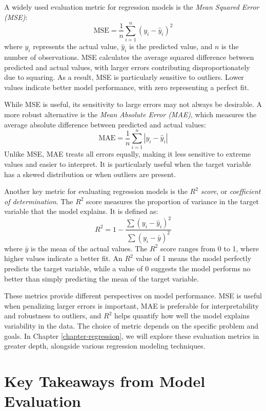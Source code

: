 \documentclass[
  11pt,
]{book}
\theoremstyle{definition}
\theoremstyle{definition}
\theoremstyle{definition}
\theoremstyle{definition}
\theoremstyle{remark}
\begin{document}
A widely used evaluation metric for regression models is the \emph{Mean Squared Error (MSE)}:
\[
\text{MSE} = \frac{1}{n} \sum_{i=1}^{n} (y_i - \hat{y}_i)^2
\]
where \(y_i\) represents the actual value, \(\hat{y}_i\) is the predicted value, and \(n\) is the number of observations. MSE calculates the average squared difference between predicted and actual values, with larger errors contributing disproportionately due to squaring. As a result, MSE is particularly sensitive to outliers. Lower values indicate better model performance, with zero representing a perfect fit.

While MSE is useful, its sensitivity to large errors may not always be desirable. A more robust alternative is the \emph{Mean Absolute Error (MAE)}, which measures the average absolute difference between predicted and actual values:
\[
\text{MAE} = \frac{1}{n} \sum_{i=1}^{n} |y_i - \hat{y}_i|
\]
Unlike MSE, MAE treats all errors equally, making it less sensitive to extreme values and easier to interpret. It is particularly useful when the target variable has a skewed distribution or when outliers are present.

Another key metric for evaluating regression models is the \emph{\(R^2\) score}, or \emph{coefficient of determination}. The \(R^2\) score measures the proportion of variance in the target variable that the model explains. It is defined as:
\[
R^2 = 1 - \frac{\sum (y_i - \hat{y}_i)^2}{\sum (y_i - \bar{y})^2}
\]
where \(\bar{y}\) is the mean of the actual values. The \(R^2\) score ranges from 0 to 1, where higher values indicate a better fit. An \(R^2\) value of 1 means the model perfectly predicts the target variable, while a value of 0 suggests the model performs no better than simply predicting the mean of the target variable.

These metrics provide different perspectives on model performance. MSE is useful when penalizing larger errors is important, MAE is preferable for interpretability and robustness to outliers, and \(R^2\) helps quantify how well the model explains variability in the data. The choice of metric depends on the specific problem and goals. In Chapter \ref{chapter-regression}, we will explore these evaluation metrics in greater depth, alongside various regression modeling techniques.

\section{Key Takeaways from Model Evaluation}\label{key-takeaways-from-model-evaluation}
\end{document}
